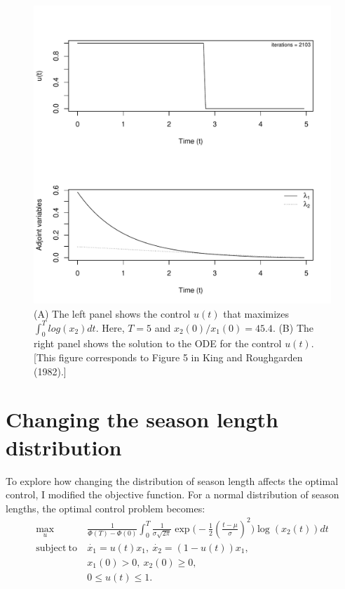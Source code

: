 \documentclass[12pt, oneside]{article}   	%
\begin{document}
 \begin{figure}[h]
   \centering
       \includegraphics[page=1,width=.9\textwidth]{../../figures/forwardBackwardSweep-x1=1-x2=454}  
    \caption{ (A) The left panel shows the control $u(t)$ that maximizes $ \int_{0}^{T} log(x_2) dt. $ Here, $ T=5$ and $x_2(0)/x_1(0) = 45.4$. (B) The right panel shows the solution to the ODE for the control $u(t)$. [This figure corresponds to Figure 5 in King and Roughgarden (1982).] }
 \label{fig:kingRoughgardenFigure5}
\end{figure}


\clearpage
\section*{Changing the season length distribution}

To explore how changing the distribution of season length affects the optimal control, I modified the objective function. For a normal distribution of season lengths, the optimal control problem becomes:
\begin{align}
\max_{u} & \frac{1}{\Phi(T)-\Phi(0)} \int_0^T \frac{1}{\sigma \sqrt{2 \pi}} \exp{\big(-\frac{1}{2} (\frac{t-\mu}{\sigma})^2\big)} \log( x_2(t) ) dt \nonumber \\
\mathrm{subject\ to\ } & \dot{x_1} = u(t) x_1,\ \dot{x_2} = (1-u(t)) x_1, \nonumber \\ 
& x_1(0) > 0,\ x_2(0) \geq 0, \nonumber \\ 
& 0 \leq u(t) \leq 1.
\end{align}
\end{document}
